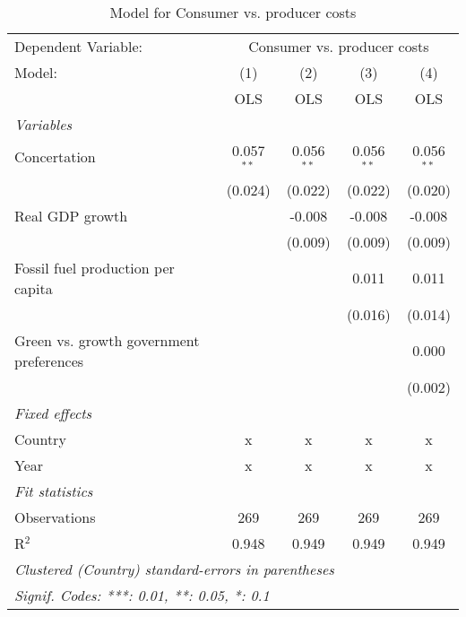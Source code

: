 
\begin{table}[htbp]
   \caption{Model for Consumer vs. producer costs}
   \centering
   \begin{tabular}{lcccc}
      \toprule
      Dependent Variable: & \multicolumn{4}{c}{Consumer vs. producer costs}\\
      Model:                                  & (1)          & (2)          & (3)          & (4)\\  
                                              &  OLS         & OLS          & OLS          & OLS\\  
      \midrule
      \emph{Variables}\\
      Concertation                            & 0.057$^{**}$ & 0.056$^{**}$ & 0.056$^{**}$ & 0.056$^{**}$\\   
                                              & (0.024)      & (0.022)      & (0.022)      & (0.020)\\   
      Real GDP growth                         &              & -0.008       & -0.008       & -0.008\\   
                                              &              & (0.009)      & (0.009)      & (0.009)\\   
      Fossil fuel production per capita       &              &              & 0.011        & 0.011\\   
                                              &              &              & (0.016)      & (0.014)\\   
      Green vs. growth government preferences &              &              &              & 0.000\\   
                                              &              &              &              & (0.002)\\   
      \emph{Fixed effects}\\
      Country                                 & x            & x            & x            & x\\  
      Year                                    & x            & x            & x            & x\\  
      \midrule \emph{Fit statistics}\\
      Observations                            & 269          & 269          & 269          & 269\\  
      R$^2$                                   & 0.948        & 0.949        & 0.949        & 0.949\\  
      \midrule
      \multicolumn{5}{l}{\emph{Clustered (Country) standard-errors in parentheses}}\\
      \multicolumn{5}{l}{\emph{Signif. Codes: ***: 0.01, **: 0.05, *: 0.1}}\\
   \end{tabular}
\end{table}


